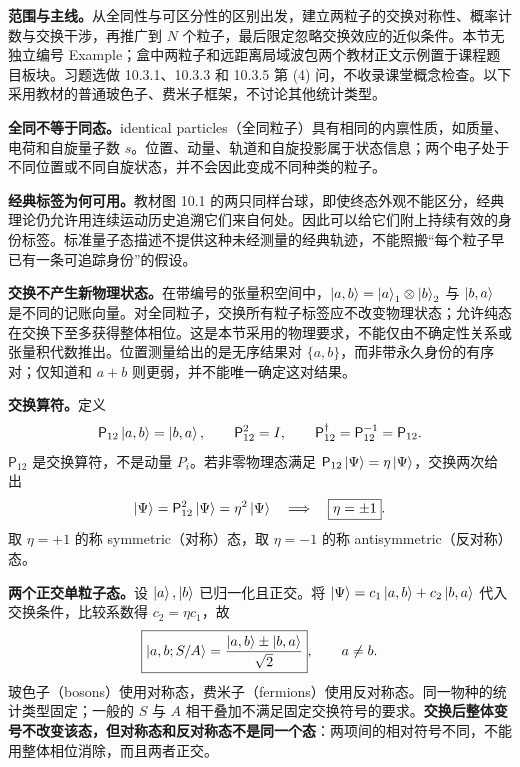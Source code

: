 \textbf{范围与主线。}从全同性与可区分性的区别出发，建立两粒子的交换对称性、概率计数与交换干涉，再推广到 $N$ 个粒子，最后限定忽略交换效应的近似条件。本节无独立编号 Example；盒中两粒子和远距离局域波包两个教材正文示例置于课程题目板块。习题选做 10.3.1、10.3.3 和 10.3.5 第 (4) 问，不收录课堂概念检查。以下采用教材的普通玻色子、费米子框架，不讨论其他统计类型。

\textbf{全同不等于同态。}identical particles（全同粒子）具有相同的内禀性质，如质量、电荷和自旋量子数 $s$。位置、动量、轨道和自旋投影属于状态信息；两个电子处于不同位置或不同自旋状态，并不会因此变成不同种类的粒子。

\textbf{经典标签为何可用。}教材图 10.1 的两只同样台球，即使终态外观不能区分，经典理论仍允许用连续运动历史追溯它们来自何处。因此可以给它们附上持续有效的身份标签。标准量子态描述不提供这种未经测量的经典轨迹，不能照搬“每个粒子早已有一条可追踪身份”的假设。

\textbf{交换不产生新物理状态。}在带编号的张量积空间中，$\left|a,b\right\rangle=\left|a\right\rangle_1\otimes\left|b\right\rangle_2$ 与 $\left|b,a\right\rangle$ 是不同的记账向量。对全同粒子，交换所有粒子标签应不改变物理状态；允许纯态在交换下至多获得整体相位。这是本节采用的物理要求，不能仅由不确定性关系或张量积代数推出。位置测量给出的是无序结果对 $\{a,b\}$，而非带永久身份的有序对；仅知道和 $a+b$ 则更弱，并不能唯一确定这对结果。

\textbf{交换算符。}定义
\begin{equation}
  \mathsf P_{12}\left|a,b\right\rangle=\left|b,a\right\rangle,\qquad
  \mathsf P_{12}^2=I,\qquad
  \mathsf P_{12}^{\dagger}=\mathsf P_{12}^{-1}=\mathsf P_{12}.
\end{equation}
$\mathsf P_{12}$ 是交换算符，不是动量 $P_i$。若非零物理态满足 $\mathsf P_{12}\left|\Psi\right\rangle=\eta\left|\Psi\right\rangle$，交换两次给出
\begin{equation}
  \left|\Psi\right\rangle=\mathsf P_{12}^2\left|\Psi\right\rangle=\eta^2\left|\Psi\right\rangle
  \quad\Longrightarrow\quad \boxed{\eta=\pm1}.
\end{equation}
取 $\eta=+1$ 的称 symmetric（对称）态，取 $\eta=-1$ 的称 antisymmetric（反对称）态。

\textbf{两个正交单粒子态。}设 $\left|a\right\rangle,\left|b\right\rangle$ 已归一化且正交。将 $\left|\Psi\right\rangle=c_1\left|a,b\right\rangle+c_2\left|b,a\right\rangle$ 代入交换条件，比较系数得 $c_2=\eta c_1$，故
\begin{equation}
  \boxed{\left|a,b;S/A\right\rangle=\frac{\left|a,b\right\rangle\pm\left|b,a\right\rangle}{\sqrt2}},
  \qquad a\ne b.
  \label{eq:QM-C10-S03-two-states}
\end{equation}
玻色子（bosons）使用对称态，费米子（fermions）使用反对称态。同一物种的统计类型固定；一般的 $S$ 与 $A$ 相干叠加不满足固定交换符号的要求。\textbf{交换后整体变号不改变该态，但对称态和反对称态不是同一个态}：两项间的相对符号不同，不能用整体相位消除，而且两者正交。

